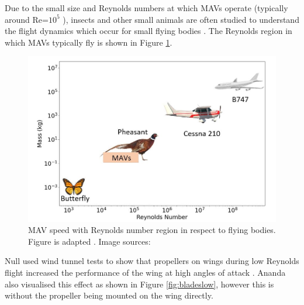 \label{sec:LowReynolds}
Due to the small size and Reynolds numbers at which MAVs operate (typically around Re=$10^5$ \cite{Huq2009} \cite{Winslow2018}), insects and other small animals are often studied to understand the flight dynamics which occur for small flying bodies \cite{Liu2009}. The Reynolds region in which MAVs typically fly is shown in Figure \ref{fig:MAVsizes}.

\begin{figure}[H]
  \centering
  \includegraphics[width=\linewidth]{03_LiteratureReview/Figs/Reynolds.JPG}
  \caption{MAV speed with Reynolds number region in respect to flying bodies. Figure is adapted \cite{reynoldsFigure}. Image sources: \cite{butterfly} \cite{pheasant} \cite{cess} \cite{b474} }
  \label{fig:MAVsizes}
\end{figure}

 Null used wind tunnel tests to show that propellers on wings during low Reynolds flight increased the performance of the wing at high angles of attack \cite{Null2005}. Ananda also visualised this effect as shown in Figure \ref{fig:bladeslow}, however this is without the propeller being mounted on the wing directly.  

